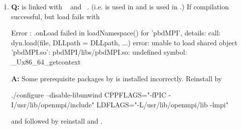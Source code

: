 \begin{enumerate}
\item {\bf\color{blue} Q:} 
       is linked with ~\citep{Chen2013pbdPROFpackage}
      and ~\citep{mpiP}.
      (i.e. \code{-} is used in  and
            \code{-} is used in .)
      If  compilation successful, but load fails with 
\begin{Error}
Error : .onLoad failed in loadNamespace() for 'pbdMPI', details:
  call: dyn.load(file, DLLpath = DLLpath, ...)
  error: unable to load shared object 'pbdMPI.so':
  pbdMPI/libs/pbdMPI.so: undefined symbol: _Ux86_64_getcontext
\end{Error}
      {\bf\color{blue} A:}
      Some prerequisite packages by  is installed incorrectly.
      Reinstall  by
\begin{Code}
./configure --disable-libunwind CPPFLAGS="-fPIC -I/usr/lib/openmpi/include" LDFLAGS="-L/usr/lib/openmpi/lib -lmpi"
\end{Code}
      and followed by reinstall  and .

\end{enumerate}
